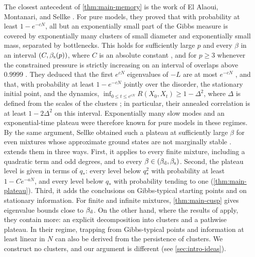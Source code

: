 The closest antecedent of \cref{thm:main-memory} is the work of El Alaoui, Montanari, and Sellke \cite{ElAlaouiMontanariSellke2025}. For pure models, they proved that with probability at least $1-e^{-cN}$, all but an exponentially small part of the Gibbs measure is covered by exponentially many clusters of small diameter and exponentially small mass, separated by bottlenecks. This holds for sufficiently large $p$ and every $\beta$ in an interval $(C,\beta_{\mathrm s}(p))$, where $C$ is an absolute constant \cite[Theorem~2.1]{ElAlaouiMontanariSellke2025}, and for $p\ge3$ whenever the constrained pressure is strictly increasing on an interval of overlaps above $0.9999$ \cite[Theorem~2.4]{ElAlaouiMontanariSellke2025}. They deduced that the first $e^{cN}$ eigenvalues of $-L$ are at most $e^{-cN}$ \cite[Corollary~2.8]{ElAlaouiMontanariSellke2025}, and that, with probability at least $1-e^{-cN}$ jointly over the disorder, the stationary initial point, and the dynamics, $\inf_{0\le t\le e^{cN}}R(X_0,X_t)\ge1-\Delta^2$, where $\Delta$ is defined from the scales of the clusters \cite[Corollary~2.9]{ElAlaouiMontanariSellke2025}; in particular, their annealed correlation is at least $1-2\Delta^2$ on this interval.
Exponentially many slow modes and an exponential-time plateau were therefore known for pure models in these regimes. By the same argument, Sellke obtained such a plateau at sufficiently large $\beta$ for even mixtures whose approximate ground states are not marginally stable \cite[Corollary~1.6]{Sellke2025marginal}.  extends them in three ways. First, it applies to every finite mixture, including a quadratic term and odd degrees, and to every $\beta\in(\beta_{\mathrm d},\beta_{\mathrm s})$. Second, the plateau level is given in terms of $q_*$: every level below $q_*^2$ with probability at least $1-Ce^{-aN}$, and every level below $q_*$ with probability tending to one (\cref{thm:main-plateau}). Third, it adds the conclusions on Gibbs-typical starting points and on stationary information. For finite and infinite mixtures, \cref{thm:main-cusp} gives eigenvalue bounds close to $\beta_{\mathrm d}$. On the other hand, where the results of \cite{ElAlaouiMontanariSellke2025} apply, they contain more: an explicit decomposition into clusters and a pathwise plateau. In their regime, trapping from Gibbs-typical points and information at least linear in $N$ can also be derived from the persistence of clusters. We construct no clusters, and our argument is different (see \cref{sec:intro-ideas}).

